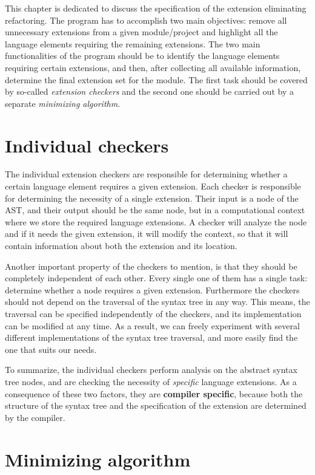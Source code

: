 \documentclass[main.tex]{subfiles}
\begin{document}
	
	This chapter is dedicated to discuss the specification of the extension eliminating refactoring. The program has to accomplish two main objectives: remove all unnecessary extensions from a given module/project and highlight all the language elements requiring the remaining extensions. The two main functionalities of the program should be to identify the language elements requiring certain extensions, and then, after collecting all available information, determine the final extension set for the module. The first task should be covered by so-called \emph{extension checkers} and the second one should be carried out by a separate \emph{minimizing algorithm}.
	
	\section{Individual checkers}
	
	The individual extension checkers are responsible for determining whether a certain language element requires a given extension. Each checker is responsible for determining the necessity of a single extension. Their input is a node of the AST, and their output should be the same node, but in a computational context where we store the required language extensions. A checker will analyze the node and if it needs the given extension, it will modify the context, so that it will contain information about both the extension and its location.
	
	Another important property of the checkers to mention, is that they should be completely independent of each other. Every single one of them has a single task: determine whether a node requires a given extension. Furthermore the checkers should not depend on the traversal of the syntax tree in any way. This means, the traversal can be specified independently of the checkers, and its implementation can be modified at any time. As a result, we can freely experiment with several different implementations of the syntax tree traversal, and more easily find the one that suits our needs.
	
	To summarize, the individual checkers perform analysis on the abstract syntax tree nodes, and are checking the necessity of \emph{specific} language extensions. As a consequence of these two factors, they are \textbf{compiler specific}, because both the structure of the syntax tree and the specification of the extension are determined by the compiler.
	
	\section{Minimizing algorithm}
	
\end{document}
